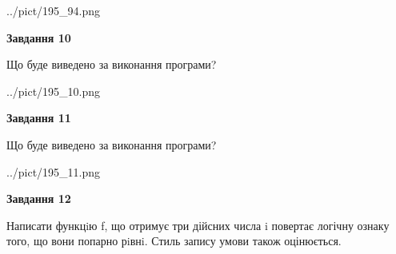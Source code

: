 \documentclass[12pt, ukrainian]{article}
\begin{document}
{\begin {large}
\begin{center}
	{../pict/195_94.png}
\end{center}
\newpage

{\begin {center}\textbf{Завдання 10}\end {center}}

Що буде виведено за виконання програми?\par
\begin{center}
	{../pict/195_10.png}
\end{center}
\newpage

{\begin {center}\textbf{Завдання 11}\end {center}}

Що буде виведено за виконання програми?\par
\begin{center}
	{../pict/195_11.png}
\end{center}
\newpage

{\begin {center}\textbf{Завдання 12}\end {center}}


Написати функцiю f, що отримує три дійсних числа i повертає логічну ознаку того, що вони попарно рiвнi. Стиль запису умови також оцінюється.\par
\newpage

\end {large}}
\end{document}

